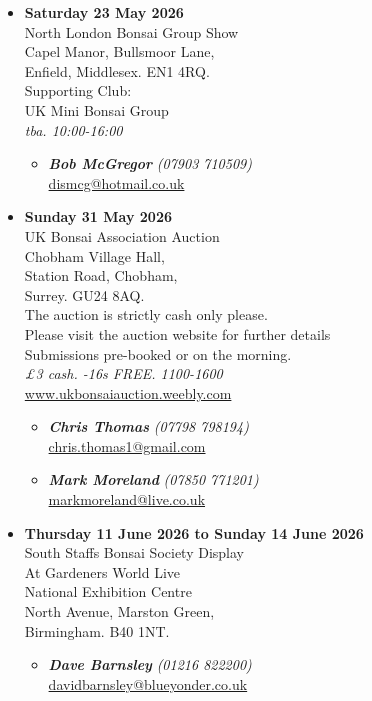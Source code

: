 \begin{itemize}
    \item \textbf{Saturday 23 May 2026}
    \\
    North London Bonsai Group Show \\
    Capel Manor, Bullsmoor Lane, \\
    Enfield, Middlesex. EN1 4RQ. \\
    Supporting Club: \\
    UK Mini Bonsai Group
    \\
    \emph{tba. 10:00-16:00}
    \begin{itemize}
        \item \textbf{\emph{Bob McGregor}} \emph{(07903 710509)} \\
        \href{mailto:dismcg@hotmail.co.uk}{dismcg@hotmail.co.uk} 
    \end{itemize}

    \item \textbf{Sunday 31 May 2026}
    \\
    UK Bonsai Association Auction \\
    Chobham Village Hall, \\
    Station Road, Chobham, \\
    Surrey. GU24 8AQ. \\
    The auction is strictly cash only please. \\
    Please visit the auction website for further details \\
    Submissions pre-booked or on the morning.
    \\
    \emph{£3 cash. -16s FREE. 1100-1600}
    \\
    \href{https://www.ukbonsaiauction.weebly.com}{www.ukbonsaiauction.weebly.com}
    \begin{itemize}
        \item \textbf{\emph{Chris Thomas}} \emph{(07798 798194)} \\
        \href{mailto:chris.thomas1@gmail.com}{chris.thomas1@gmail.com} 
        \item \textbf{\emph{Mark Moreland}} \emph{(07850 771201)} \\
        \href{mailto:markmoreland@live.co.uk}{markmoreland@live.co.uk} 
    \end{itemize}

    \item \textbf{Thursday 11 June 2026 to Sunday 14 June 2026}
    \\
    South Staffs Bonsai Society Display \\
    At Gardeners World Live \\
    National Exhibition Centre \\
    North Avenue, Marston Green, \\
    Birmingham. B40 1NT.
    \begin{itemize}
        \item \textbf{\emph{Dave Barnsley}} \emph{(01216 822200)} \\
        \href{mailto:davidbarnsley@blueyonder.co.uk}{davidbarnsley@blueyonder.co.uk} 
    \end{itemize}


\end{itemize}
